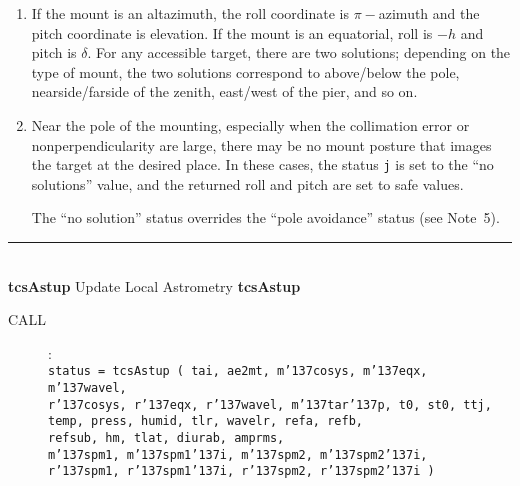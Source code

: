 \documentclass[12pt,fleqn,twoside]{article}
\renewcommand{\_}{{\tt\char'137}}     %
\newcommand{\routine}[2]
{
  \newpage
  \rule{\textwidth}{0.3mm}\\ \nopagebreak
  {\Large {\bf #1} \hfill #2 \hfill {\bf #1}}
  \vspace{-1ex}
}
\newcommand{\call}[1]
{
  \goodbreak
  \begin{description}
    \item[CALL]: \\[0.5ex] \nopagebreak
        {\tt #1}
  \end{description}
  \vspace{-3ex}
}
\begin{document}
{\begin{enumerate}
      It is permissible to set {\tt rnogo} to zero, and to handle any pole
      problems in the TCS application itself.  Two strategies that
      might be considered as an alternative to the {\tt rnogo} approach are
      (i)~progressive scaling back of certain of the pointing
      coefficients so that close to the pole the mount becomes
      nominally perfect, and (ii)~substituting a fictitious target that
      makes the telescope loiter on the edge of the awkward region
      until the real target catches up.
\item If the mount is an altazimuth, the roll coordinate is $\pi-$azimuth
      and the pitch coordinate is elevation.  If the mount is an
      equatorial, roll is $-h$ and pitch is $\delta$.  For any
      accessible target, there are two solutions; depending on the type
      of mount, the two solutions correspond to above/below the pole,
      nearside/farside of the zenith, east/west of the pier, and so on.
\item Near the pole of the mounting, especially when the collimation
      error or nonperpendicularity are large, there may be no mount
      posture that images the target at the desired place.  In these
      cases, the status {\tt j}
      is set to the ``no solutions'' value, and the
      returned roll and pitch are set to safe values.

      The ``no solution'' status overrides the ``pole avoidance'' status
      (see Note~5).
\end{enumerate}
}
\routine{tcsAstup}{Update Local Astrometry}
\label{tcsAstup}
\call{status = tcsAstup ( tai, ae2mt,
                          m\_cosys, m\_eqx, m\_wavel, \\
          \hspace*{9.6em} r\_cosys, r\_eqx, r\_wavel,
                          m\_tar\_p, t0, st0, ttj, \\
          \hspace*{9.6em} temp, press, humid, tlr, wavelr, refa, refb, \\
          \hspace*{9.6em} refsub, hm, tlat, diurab, amprms, \\
          \hspace*{9.6em} m\_spm1, m\_spm1\_i,
                          m\_spm2, m\_spm2\_i, \\
          \hspace*{9.6em} r\_spm1, r\_spm1\_i,
                          r\_spm2, r\_spm2\_i )}
\end{document}
